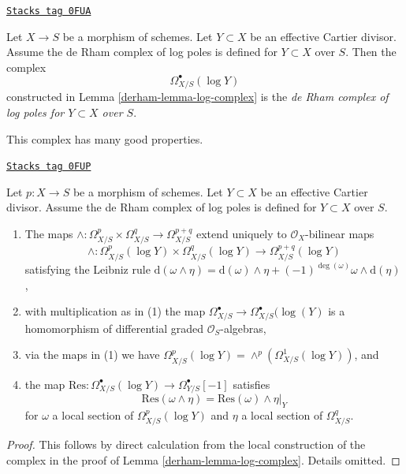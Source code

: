 \begin{definition}
\label{derham-definition-log-complex}
\href{https://stacks.math.columbia.edu/tag/0FUA}{\texttt{Stacks tag 0FUA}}

Let $X \to S$ be a morphism of schemes. Let $Y \subset X$ be an
effective Cartier divisor. Assume the de Rham complex of log poles
is defined for $Y \subset X$ over $S$. Then the complex
$$
\Omega^\bullet_{X/S}(\log Y)
$$
constructed in Lemma \ref{derham-lemma-log-complex} is the
{\it de Rham complex of log poles for $Y \subset X$ over $S$}.
\end{definition}

This complex has many good properties.

\begin{lemma}
\label{derham-lemma-multiplication-log}
\href{https://stacks.math.columbia.edu/tag/0FUP}{\texttt{Stacks tag 0FUP}}

Let $p : X \to S$ be a morphism of schemes. Let $Y \subset X$ be an
effective Cartier divisor. Assume the de Rham complex of log poles
is defined for $Y \subset X$ over $S$.
\begin{enumerate}
\item The maps
$\wedge : \Omega^p_{X/S} \times \Omega^q_{X/S} \to \Omega^{p + q}_{X/S}$
extend uniquely to $\mathcal{O}_X$-bilinear maps
$$
\wedge : \Omega^p_{X/S}(\log Y) \times \Omega^q_{X/S}(\log Y)
\to \Omega^{p + q}_{X/S}(\log Y)
$$
satisfying the Leibniz rule
$
\text{d}(\omega \wedge \eta) = \text{d}(\omega) \wedge \eta +
(-1)^{\deg(\omega)} \omega \wedge \text{d}(\eta)$,
\item with multiplication as in (1) the map
$\Omega^\bullet_{X/S} \to \Omega^\bullet_{X/S}(\log(Y)$
is a homomorphism of differential graded $\mathcal{O}_S$-algebras,
\item via the maps in (1) we have $\Omega^p_{X/S}(\log Y) =
\wedge^p(\Omega^1_{X/S}(\log Y))$, and
\item the map
$\text{Res} : \Omega^\bullet_{X/S}(\log Y) \to \Omega^\bullet_{Y/S}[-1]$
satisfies
$$
\text{Res}(\omega \wedge \eta) = \text{Res}(\omega) \wedge \eta|_Y
$$
for $\omega$ a local section of $\Omega^p_{X/S}(\log Y)$ and $\eta$
a local section of $\Omega^q_{X/S}$.
\end{enumerate}
\end{lemma}

\begin{proof}

This follows by direct calculation from the local construction
of the complex in the proof of Lemma \ref{derham-lemma-log-complex}.
Details omitted.
\end{proof}

